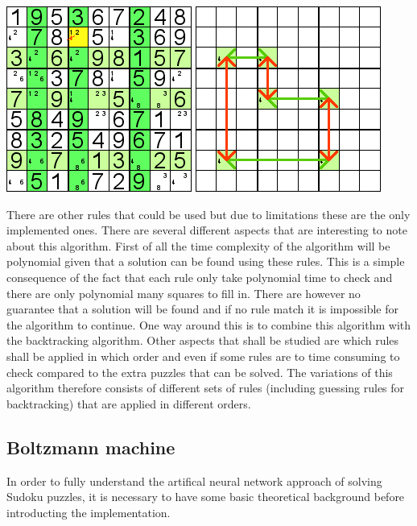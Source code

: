 \documentclass[a4paper,11pt]{kth-mag}
\begin{document}
\begin{description}
\includegraphics{images/swordfish1.png}
\newline
\includegraphics{images/swordfish2.png}

\end{description}

There are other rules that could be used but due to limitations these are the only implemented ones.
There are several different aspects that are interesting to note about this algorithm.
First of all the time complexity of the algorithm will be polynomial given that a solution can be found using these rules.
This is a simple consequence of the fact that each rule only take polynomial time to check and there are only polynomial many squares to fill in.
There are however no guarantee that a solution will be found and if no rule match it is impossible for the algorithm to continue.
One way around this is to combine this algorithm with the backtracking algorithm.
Other aspects that shall be studied are which rules shall be applied in which order and even if some rules are to time consuming to check compared to the extra puzzles that can be solved.
The variations of this algorithm therefore consists of different sets of rules (including guessing rules for backtracking) that are applied in different orders. 

\subsection{Boltzmann machine}
In order to fully understand the artifical neural network approach of solving Sudoku puzzles, it is necessary to have some basic theoretical background before introducting the implementation.
\end{document}
